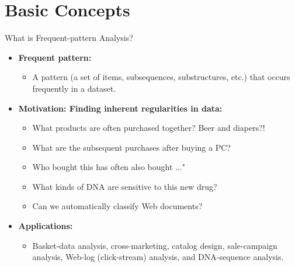 \section{Basic Concepts}

\begin{frame}{What is Frequent-pattern Analysis?}
	\begin{itemize}
		\item \textbf{Frequent pattern:}
		      \begin{itemize}
			      \item A pattern (a set of items, subsequences, substructures, etc.)
			            that occurs frequently in a dataset.
		      \end{itemize}
		\item \textbf{Motivation: Finding inherent regularities in data:}
		      \begin{itemize}
			      \item What products are often purchased together? Beer and diapers?!
			      \item What are the subsequent purchases after buying a PC?
			      \item Who bought this has often also bought $\ldots$"
			      \item What kinds of DNA are sensitive to this new drug?
			      \item Can we automatically classify Web documents?
		      \end{itemize}
		\item \textbf{Applications:}
		      \begin{itemize}
			      \item Basket-data analysis, cross-marketing, catalog design,
			            sale-campaign analysis, Web-log (click-stream) analysis, and
			            DNA-sequence analysis.
		      \end{itemize}
	\end{itemize}
\end{frame}

